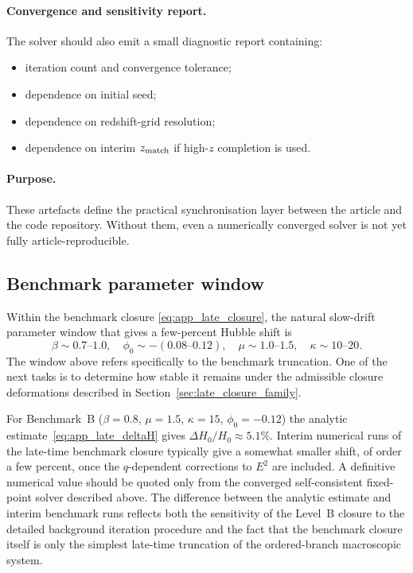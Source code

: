 \documentclass[11pt,a4paper]{article}
\numberwithin{equation}{section}
\begin{document}
\paragraph{Convergence and sensitivity report.}
The solver should also emit a small diagnostic report containing:
\begin{itemize}
  \item iteration count and convergence tolerance;
  \item dependence on initial seed;
  \item dependence on redshift-grid resolution;
  \item dependence on interim $z_{\rm match}$ if high-$z$ completion is used.
\end{itemize}

\paragraph{Purpose.}
These artefacts define the practical synchronisation layer between the
article and the code repository.
Without them, even a numerically converged solver is not yet fully
article-reproducible.

\subsection{Benchmark parameter window}

Within the benchmark closure \eqref{eq:app_late_closure}, the natural
slow-drift parameter window that gives a few-percent Hubble shift is
\begin{equation}
\beta\sim 0.7\text{--}1.0,\quad
\phi_0\sim -(0.08\text{--}0.12),\quad
\mu\sim 1.0\text{--}1.5,\quad
\kappa\sim 10\text{--}20.
\label{eq:app_algo_window}
\end{equation}
The window above refers specifically to the benchmark truncation.
One of the next tasks is to determine how stable it remains under the
admissible closure deformations described in
Section~\ref{sec:late_closure_family}.

For Benchmark~B ($\beta=0.8$, $\mu=1.5$, $\kappa=15$, $\phi_0=-0.12$)
the analytic estimate~\eqref{eq:app_late_deltaH} gives
$\Delta H_0/H_0\approx 5.1\%$.
Interim numerical runs of the late-time benchmark closure typically give
a somewhat smaller shift, of order a few percent, once the $q$-dependent
corrections to $E^2$ are included.
A definitive numerical value should be quoted only from the converged
self-consistent fixed-point solver described above.
The difference between the analytic estimate and interim benchmark runs
reflects both the sensitivity of the Level~B closure to the detailed
background iteration procedure and the fact that the benchmark closure
itself is only the simplest late-time truncation of the ordered-branch
macroscopic system.
\end{document}
